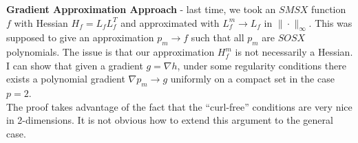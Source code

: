 \documentclass[11pt,reqno]{amsart}
\theoremstyle{definition}
\numberwithin{equation}{section}
\newcommand{\tb}{\textbf}
\begin{document}
\tb{Gradient Approximation Approach} - last time, we took an $SMSX$ function $f$ with Hessian $H_f = L_f L_f^T$ and approximated with $L_f^m \to L_f$ in $\| \cdot \|_{\infty}$. This was supposed to give an approximation $p_m \to f$ such that all $p_m$ are $SOSX$ polynomials. The issue is that our approximation $H_f^m$ is not necessarily a Hessian. I can show that given a gradient $g = \nabla h$, under some regularity conditions there exists a polynomial gradient $\nabla p_m \to g$ uniformly on a compact set in the case $p = 2$.\\

The proof takes advantage of the fact that the ``curl-free'' conditions are very nice in 2-dimensions. It is not obvious how to extend this argument to the general case. 
\end{document}

